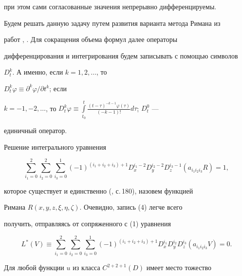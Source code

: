 при этом сами согласованные значения непрерывно дифференцируемы. 


 


Будем решать данную задачу путем развития варианта метода Римана из 


работ \cite{9}, \cite{11}. Для сокращения объема формул далее операторы 


дифференцирования и интегрирования будем записывать с помощью символов 


$D^k_t$. А именно, если $k=1,2,\dotsc$, то 


$D^k_t\varphi\equiv\partial^k\varphi/\partial t^k$; если


$k=-1,-2,\dotsc$, то $D^k_t\varphi\equiv\int\limits^t_{t_0} 


\frac{(t-\tau)^{-k-1}\varphi(\tau)}{(-k-1)!}d\tau$; $D^0_t$ --- 


единичный оператор. 


 


Решение интегрального уравнения 


\begin{equation} 


\sum^2_{i_1=0}\sum^2_{i_2=0}\sum^1_{i_3=0} 


(-1)^{(i_1+i_2+i_3)+1}D^{i_1-2}_x D^{i_2-2}_y D^{i_3-1}_z 


(a_{i_1i_2i_3}R)=1, 


\end{equation} 


которое существует и единственно (\cite{15}, с.\,180), назовем функцией 


Римана $R(x,y,z,\xi,\eta,\zeta)$. Очевидно, запись (4) легче всего 


получить, отправляясь от сопряженного с (1) уравнения 


\begin{equation} 


L^*(V)\equiv\sum^2_{i_1=0}\sum^2_{i_2=0}\sum^1_{i_3=0} 


(-1)^{(i_1+i_2+i_3)+1}D^{i_1}_x D^{i_2}_y D^{i_3}_z 


(a_{i_1i_2i_3}V)=0. 


\end{equation} 


 


Для любой функции $u$ из класса $C^{2+2+1}(D)$ имеет место тожество 


